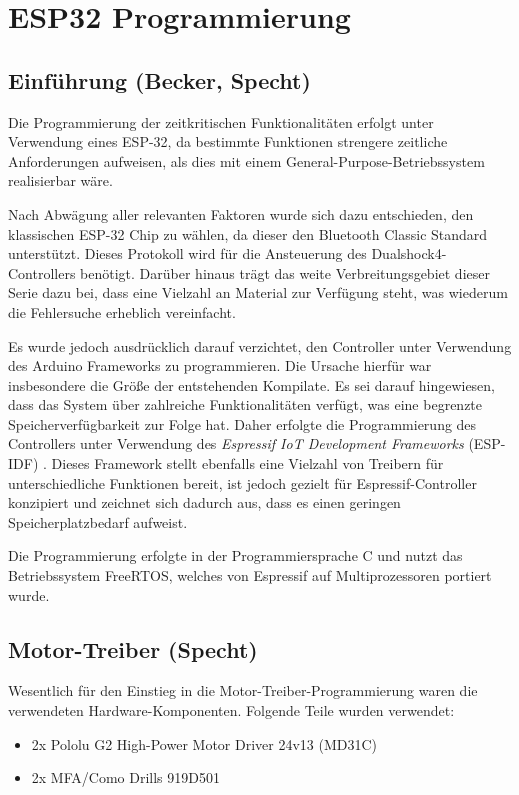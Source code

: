 \chapter{ESP32 Programmierung}

\section{Einführung (Becker, Specht)}

Die Programmierung der zeitkritischen Funktionalitäten erfolgt unter Verwendung eines \mbox{ESP-32}, da bestimmte Funktionen strengere zeitliche Anforderungen aufweisen, als dies mit einem General-Purpose-Betriebssystem realisierbar wäre.

Nach Abwägung aller relevanten Faktoren wurde sich dazu entschieden, den klassischen \mbox{ESP-32} Chip zu wählen, da dieser den Bluetooth Classic Standard unterstützt. 
Dieses Protokoll wird für die Ansteuerung des Dualshock4-Controllers benötigt.
Darüber hinaus trägt das weite Verbreitungsgebiet dieser Serie dazu bei, dass eine Vielzahl an Material zur Verfügung steht, was wiederum die Fehlersuche erheblich vereinfacht.

Es wurde jedoch ausdrücklich darauf verzichtet, den Controller unter Verwendung des Arduino Frameworks zu programmieren. 
Die Ursache hierfür war insbesondere die Größe der entstehenden Kompilate. 
Es sei darauf hingewiesen, dass das System über zahlreiche Funktionalitäten verfügt, was eine begrenzte Speicherverfügbarkeit zur Folge hat. 
Daher erfolgte die Programmierung des Controllers unter Verwendung des \textit{Espressif IoT Development Frameworks} (ESP-IDF) \cite{esp_esp_idf}. 
Dieses Framework stellt ebenfalls eine Vielzahl von Treibern für unterschiedliche Funktionen bereit, ist jedoch gezielt für Espressif-Controller konzipiert und zeichnet sich dadurch aus, dass es einen geringen Speicherplatzbedarf aufweist. 

Die Programmierung erfolgte in der Programmiersprache C und nutzt das Betriebssystem FreeRTOS, welches von Espressif auf Multiprozessoren portiert wurde.

\section{Motor-Treiber (Specht)}

Wesentlich für den Einstieg in die Motor-Treiber-Programmierung waren die verwendeten Hardware-Komponenten. Folgende Teile wurden verwendet:

\begin{itemize}
    \item 2x Pololu G2 High-Power Motor Driver 24v13 (MD31C)
    \item 2x MFA/Como Drills 919D501
\end{itemize}

